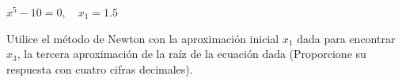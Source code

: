 \item $x^5 - 10 = 0, \quad x_1 = 1.5$
\par
Utilice el método de Newton con la aproximación inicial $x_1$ dada para encontrar $x_3$, la tercera aproximación de la raíz de la ecuación dada (Proporcione su respuesta con cuatro cifras decimales).
